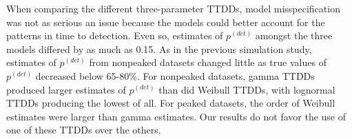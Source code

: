 \documentclass[12pt]{article}
\newcommand{\pdet}{p^{(det)}}
\begin{document}

When comparing the different three-parameter TTDDs, model misspecification was not as serious an issue because the models could better account for the patterns in time to detection.
Even so, estimates of $\pdet$ amongst the three models differed by as much as 0.15.
As in the previous simulation study, estimates of $\pdet$ from nonpeaked datasets changed little as true values of $\pdet$ decreased below 65-80\%.
For nonpeaked datasets, gamma TTDDs produced larger estimates of $\pdet$ than did Weibull TTDDs, with lognormal TTDDs producing the lowest of all.
For peaked datasets, the order of Weibull estimates were larger than gamma estimates.
Our results do not favor the use of one of these TTDDs over the others.
\end{document}
